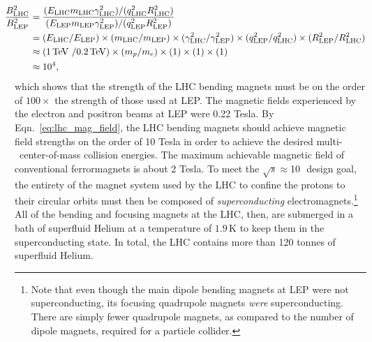 \begin{align}
    \hspace{-0.4cm}
    \frac{B^2_{\text{LHC}}}{B^2_\text{LEP}} &= \frac{ (E_{\text{LHC}} m_{\text{LHC}} \gamma_{\text{LHC}}^2) / (q_{\text{LHC}}^2 R_{\text{LHC}}^2)  } { (E_{\text{LEP}} m_{\text{LEP}} \gamma_{\text{LEP}}^2) / (q_{\text{LEP}}^2 R_{\text{LEP}}^2) } \label{eq:lhc_mag_field} \\
        &= (E_{\text{LHC}} / E_{\text{LEP}}) \times (m_{\text{LHC}} / m_{\text{LEP}}) \times (\gamma_{\text{LHC}}^2 / \gamma_{\text{LEP}}^2) \times (q_{\text{LEP}}^2 / q_{\text{LHC}}^2) \times (R_{\text{LEP}}^2 / R_{\text{LHC}}^2) \notag \\
        &\approx ( 1\,\TeV~/0.2\,\TeV) \times (m_p/ m_e) \times (1) \times (1) \times (1) \notag \\
        &\approx 10^4 \notag,
\end{align}
which shows that the strength of the LHC bending magnets must be on the order of $100\times$
the strength of those used at LEP. The magnetic fields experienced by the electron and positron beams
at LEP were 0.22 Tesla. By Eqn.~\ref{eq:lhc_mag_field}, the LHC bending magnets should achieve magnetic field
strengths on the order of 10 Tesla in order to achieve the desired multi-\TeV~center-of-mass collision energies.
The maximum achievable magnetic field of conventional ferrormagnets is about 2 Tesla.
To meet the $\sqrt{s}\approx$10\,\TeV~design goal, the entirety of the magnet system used by the LHC to confine the protons to their circular orbits
must then be composed of \textit{superconducting} electromagnets.\footnote{Note that even though
the main dipole bending magnets at LEP were not superconducting, its focusing quadrupole magnets
\textit{were} superconducting. There are simply fewer quadrupole magnets, as compared to the number of
dipole magnets, required for a particle collider.}
All of the bending and focusing magnets at the LHC, then, are submerged in a bath of superfluid Helium
at a temperature of $1.9$\,K to keep them in the superconducting state. In total, the LHC contains more than 120 tonnes of superfluid Helium.




